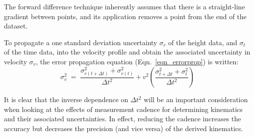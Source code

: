 \documentclass[namedreferences]{SolarPhysics}
\begin{document}
\begin{article}


The forward difference technique inherently assumes that there is a straight-line gradient between points, and its application removes a point from the end of the dataset.

To propagate a one standard deviation uncertainty $\sigma_r$ of the height data, and $\sigma_t$ of the time data, into the velocity profile and obtain the associated uncertainty in velocity $\sigma_v$, the error propagation equation (Eqn.~\ref{eqn_errorprop}) is written:
\begin{equation}
\label{eqn_fwderrorprop}
\sigma_v^2 \; = \; \frac{\sigma_{r(t+\Delta t)}^2+\sigma_{r(t)}^2}{\Delta t^2} + v^2 \left( \frac{\sigma_{t+\Delta t}^2+\sigma_t^2}{\Delta t^2} \right) %
\end{equation}

It is clear that the inverse dependence on $\Delta t^2$ will be an important consideration when looking at the effects of measurement cadence for determining kinematics and their associated uncertainties. In effect, reducing the cadence increases the accuracy but decreases the precision (and vice versa) of the derived kinematics.



\end{article}
\end{document}
